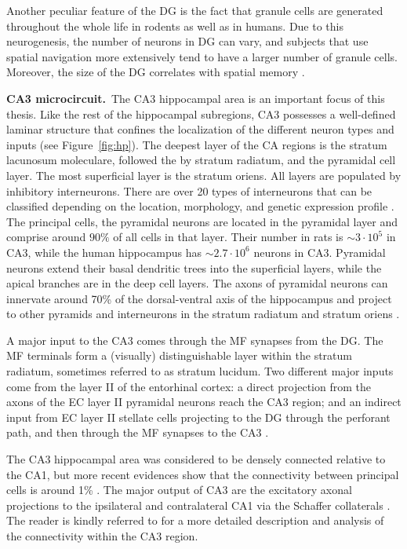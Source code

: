     Another peculiar feature of the DG is the fact that granule cells are
    generated throughout the whole life in rodents as well as in humans. Due to
    this neurogenesis, the number of neurons in DG can vary, and subjects that
    use spatial navigation more extensively tend to have a larger number of
    granule cells. Moreover, the size of the DG correlates with spatial memory
    \citep{Maguire2000, Spalding2013}.

    \textbf{CA3 microcircuit.}\,
    The CA3 hippocampal area is an important focus of this thesis. Like the
    rest of the hippocampal subregions, CA3 possesses a well-defined laminar
    structure that confines the localization of the different neuron types and
    inputs (see Figure~\ref{fig:hp}). The deepest layer of the CA regions is
    the stratum lacunosum moleculare, followed the by stratum radiatum, and the
    pyramidal cell layer. The most superficial layer is the stratum oriens. All
    layers are populated by inhibitory interneurons. There are over 20 types of
    interneurons that can be classified depending on the location, morphology,
    and genetic expression profile \citep{Maccaferri2003, Klausberger2008}. The
    principal cells, the pyramidal neurons are located in the pyramidal layer
    and comprise around $90\%$ of all cells in that layer. Their number in
    rats is $\sim 3 \cdot 10^5$ \citep{Boss1985, Boss1987} in CA3, while the
    human hippocampus has $\sim 2.7 \cdot 10^6$ neurons in CA3.  Pyramidal
    neurons extend their basal dendritic trees into the superficial layers,
    while the apical branches are in the deep cell layers. The axons of
    pyramidal neurons can innervate around 70\% of the dorsal-ventral axis of
    the hippocampus and project to other pyramids and interneurons in the
    stratum radiatum and stratum oriens \citep{Sik1993, Li1994}.

    A major input to the CA3 comes through the MF synapses from the DG. The MF
    terminals form a (visually) distinguishable layer within the stratum radiatum,
    sometimes referred to as stratum lucidum. Two different major inputs come
    from the layer II of the entorhinal cortex: a direct projection from the
    axons of the EC layer II pyramidal neurons reach the CA3 region; and an
    indirect input from EC layer II stellate cells projecting to the DG through
    the perforant path, and then through the MF synapses to the CA3
    \citep{Tang2014}. 
    
    The CA3 hippocampal area was considered to be densely connected 
    \cite[$\sim3 \%
    $ in][]{Miles1986} relative to the CA1, but more recent evidences show that
    the connectivity between principal cells is around 1\% \citep{Guzman2016}.
    The major output of CA3 are the excitatory axonal projections to the
    ipsilateral and contralateral CA1 via the Schaffer collaterals
    \citep{Finnerty1993}. The reader is kindly referred to \cite{Duigou2014} for a
    more detailed description and analysis of the connectivity within the
    CA3 region.

